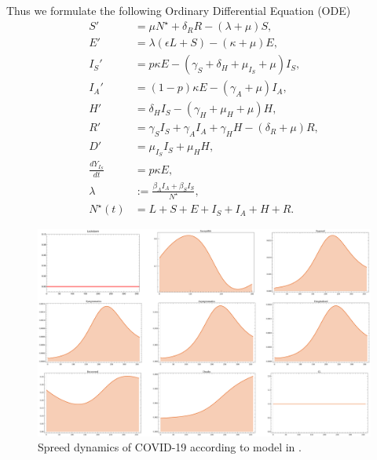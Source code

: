 Thus we formulate the following Ordinary Differential Equation (ODE)
\begin{equation}
	\label{eqn:base_dynamics}
    \begin{aligned}
        S' & =
            \mu N^\star + \delta_R R - (\lambda + \mu)
            S,
        \\
        E' & =
            \lambda (\epsilon L + S) - (\kappa + \mu) E,
        \\
        I_S' & =
            p \kappa E -
            (\gamma_S +
                \delta_H +
                \mu_{I_S} +
                \mu) I_S,
        \\
        I_A' &=
            (1 - p) \kappa E - (\gamma_A + \mu) I_A,
        \\
        H' &=
            \delta_H I_S - (\gamma_H + \mu_H + \mu) H,
        \\
        R' & =
            \gamma_S I_S + \gamma_A I_A + \gamma_H H - (\delta_R + \mu) R,
        \\
        D' &=
            \mu_{I_S} I_S + \mu_H H,
        \\
        \frac{dY_{I_S}}{dt} &  = p \kappa E,
        \\
        \lambda &:=
            \frac{\beta_A I_A + \beta_S I_S}{N^{\star}},
        \\
        N^{\star}(t) &=
            L + S + E +
            I_S + I_A +
            H + R .
    \end{aligned}
\end{equation}
%
\begin{figure}
    \begin{center}
        \includegraphics[scale=0.25,
        keepaspectratio]{Figures/no_contraled_dynamics}
    \end{center}
    \caption{
        Spreed dynamics of COVID-19 according to model in
        .
    }
\end{figure}

